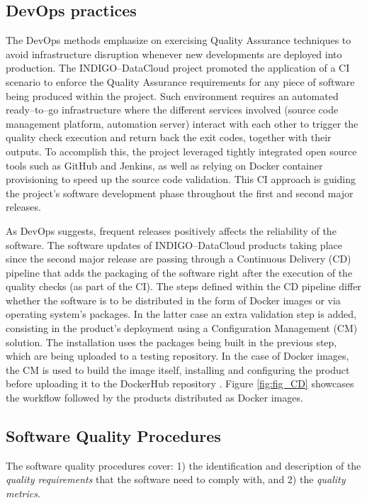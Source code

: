 \documentclass[journal]{IEEEtran}
\begin{document}
\subsection{DevOps practices}

The DevOps methods emphasize on exercising Quality Assurance techniques to avoid infrastructure disruption whenever new developments are deployed into production. The INDIGO--DataCloud project promoted the application of a CI scenario to enforce the Quality Assurance requirements for any piece of software being produced within the project. Such environment requires an automated ready--to--go infrastructure where the different services involved (source code management platform, automation server) interact with each other to trigger the quality check execution and return back the exit codes, together with their outputs. To accomplish this, the project leveraged tightly integrated open source tools such as GitHub and Jenkins, as well as relying on Docker container provisioning to speed up the source code validation. This CI approach is guiding the project’s software development phase throughout the first and second major releases.

As DevOps suggests, frequent releases positively affects the reliability of the software. The software updates of INDIGO--DataCloud products taking place since the second major release are passing through a Continuous Delivery (CD) pipeline that adds the packaging of the software right after the execution of the quality checks (as part of the CI). The steps defined within the CD pipeline differ whether the software is to be distributed in the form of Docker images or via operating system’s packages. In the latter case an extra validation step is added, consisting in the product’s deployment using a Configuration Management (CM) solution. The installation uses the packages being built in the previous step, which are being uploaded to a testing repository. In the case of Docker images, the CM is used to build the image itself, installing and configuring the product before uploading it to the DockerHub repository \cite{indigo-dockerhub}. Figure \ref{fig:fig_CD} showcases the workflow followed by the products distributed as Docker images.

\subsection{Software Quality Procedures}

The software quality procedures \cite{indigo-d31} cover: 1) the identification and description of the \emph{quality requirements} that the software need to comply with, and 2) the \emph{quality metrics}.
\end{document}
